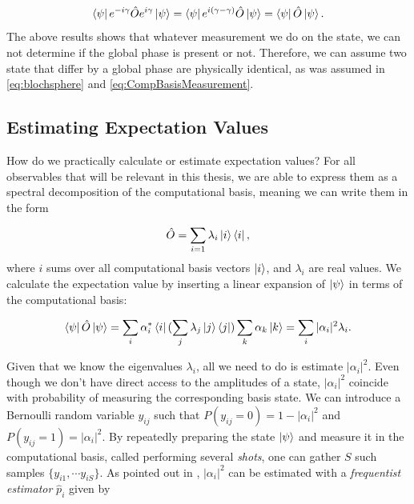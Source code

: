\begin{equation}\label{eq:ExpectedValue}
    \bra{\psi}e^{-i\gamma}
    \hat{O}e^{i\gamma}\ket{\psi} =\bra{\psi}e^{i(\gamma-\gamma) }\hat{O}\ket{\psi} = 
    \bra{\psi}\hat{O}\ket{\psi}.
\end{equation}
The above results shows that whatever measurement we do on the state, we can not determine if the global phase is present or not. Therefore, we can assume two state that differ by a global phase are physically identical, as was assumed in \autoref{eq:blochsphere} and \autoref{eq:CompBasisMeasurement}.

\subsection{Estimating Expectation Values}\label{sec:EstimatingExpectationValues}

How do we practically calculate or estimate expectation values? For all observables that will be relevant in this thesis, we are able to express them as a spectral decomposition of the computational basis, meaning we can write them in the form 

\begin{equation}\label{eq:ExpectedValue}
    \hat{O} = \sum_{i=1} \lambda_i\ket{i}\bra{i},
\end{equation}
where $i$ sums over all computational basis vectors $\ket{i}$, and $\lambda_i$ are real values. We calculate the expectation value by inserting a linear expansion of $\ket{\psi}$ in terms of the computational basis:

\begin{equation}\label{eq:ExpectedValueExact}
    \bra{\psi}\hat{O}\ket{\psi} = \sum_{i} \alpha_i^*\bra{i}(\sum_{j} \lambda_j\ket{j}\bra{j})\sum_{k} \alpha_k\ket{k} = \sum_{i} |\alpha_i|^2\lambda_i.
\end{equation}

Given that we know the eigenvalues $\lambda_i$, all we need to do is estimate $|\alpha_i|^2$. Even though we don't have direct access to the amplitudes of a state, $|\alpha_i|^2$ coincide with probability of measuring the corresponding basis state. We can introduce a Bernoulli random variable $y_{ij}$ such that $P(y_{ij} = 0) = 1-|\alpha_i|^2$ and $P(y_{ij} = 1) = |\alpha_i|^2$. By repeatedly preparing the state $\ket{\psi}$ and measure it in the computational basis, called performing several \emph{shots}, one can gather $S$ such samples $\{y_{i1}, \cdots y_{iS}\}$. As pointed out in \citet{SupervisedwquantumComputers}, $|\alpha_i|^2$ can be estimated with a \emph{frequentist estimator} $\hat{p}_i$ given by

